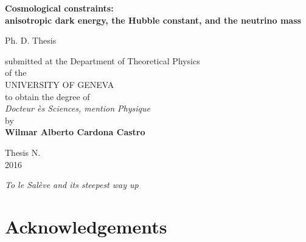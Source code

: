 \documentclass[12pt]{report}
\date{}
\renewcommand{\(}{\left(}
\renewcommand{\)}{\right)}
\renewcommand{\[}{\left[}
\renewcommand{\]}{\right]}
\begin{document}
\renewcommand{\figurename}{\textbf{Fig.}}
\renewcommand{\tablename}{\textbf{Tab.}}

\thispagestyle{empty}
\begin{center}  

\Large  \textbf{Cosmological constraints: \\
anisotropic dark energy, the Hubble constant, and the neutrino mass} \\
  
\vspace{3.5cm}  

\large Ph. D. Thesis

\vspace{3.5cm}

submitted at the Department of Theoretical Physics \\

of the \\

UNIVERSITY OF GENEVA\\

to obtain the degree of \\

\textit{Docteur ès Sciences, mention Physique}\\

by\\

\large \textbf{Wilmar Alberto Cardona Castro}\\  

\vspace{3.5cm} 

\large Thesis N. \\  
\normalsize 2016  

\end{center}  

\newpage  
{}
  
  
\vspace{6cm}  
\begin{center}

\large \textit{To le Sal\`{e}ve and its steepest way up}
\normalsize

\end{center}
  
\newpage  

\chapter*{Acknowledgements} 
\end{document}
